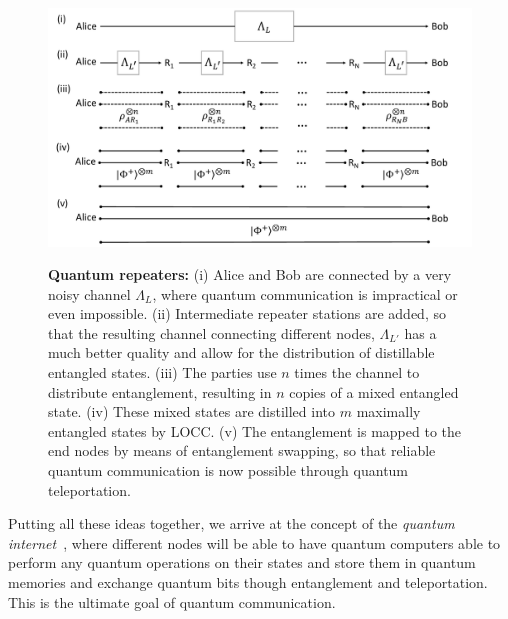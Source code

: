 \documentclass[a4paper]{article}
\begin{document}
\begin{figure}
\begin{center}
  \includegraphics[width=13cm]{QRepeater.pdf}\\
  \caption{\textbf{Quantum repeaters:} (i) Alice and Bob are connected by a very noisy channel $\Lambda_L$, where quantum communication is impractical or even impossible. (ii) Intermediate repeater stations are added, so that the resulting channel connecting different nodes, $\Lambda_{L'}$ has a much better quality and allow for the distribution of distillable entangled states. (iii) The parties use $n$ times the channel to distribute entanglement, resulting in $n$ copies of a mixed entangled state. (iv) These mixed states are distilled into $m$ maximally entangled states by LOCC. (v) The entanglement is mapped to the end nodes by means of entanglement swapping, so that reliable quantum communication is now possible through quantum teleportation.}\label{qrepfig}
  \end{center}
\end{figure}



Putting all these ideas together, we arrive at the concept of the \emph{quantum internet}~\cite{kimble}, where different nodes will be able to have quantum computers able to perform any quantum operations on their states and store them in quantum memories and exchange quantum bits though entanglement and teleportation. This is the ultimate goal of quantum communication.
\end{document}
